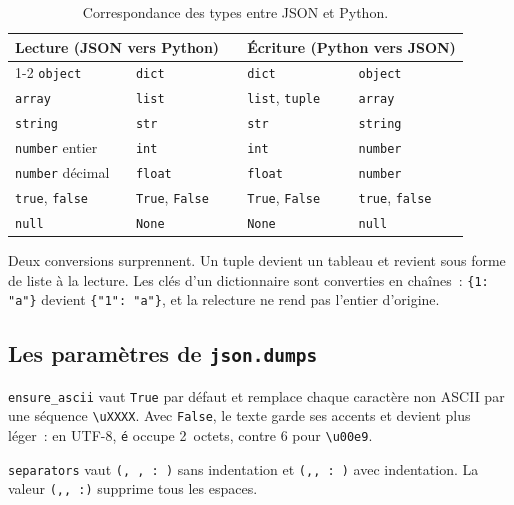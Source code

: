 \documentclass[12pt,a4paper]{article}
\newcommand{\exemple}[3][]{%
  \par\addvspace{6pt}\noindent\begin{minipage}{\linewidth}%
  \end{minipage}\par\addvspace{6pt}}
\begin{document}
\begin{table}[htbp]
\centering
\small
\begin{tabular}{llcll}
\toprule
\multicolumn{2}{c}{\textbf{Lecture (JSON vers Python)}} & & \multicolumn{2}{c}{\textbf{Écriture (Python vers JSON)}} \\
\cmidrule{1-2}\cmidrule{4-5}
\texttt{object} & \texttt{dict} & & \texttt{dict} & \texttt{object} \\
\texttt{array} & \texttt{list} & & \texttt{list}, \texttt{tuple} & \texttt{array} \\
\texttt{string} & \texttt{str} & & \texttt{str} & \texttt{string} \\
\texttt{number} entier & \texttt{int} & & \texttt{int} & \texttt{number} \\
\texttt{number} décimal & \texttt{float} & & \texttt{float} & \texttt{number} \\
\texttt{true}, \texttt{false} & \texttt{True}, \texttt{False} & & \texttt{True}, \texttt{False} & \texttt{true}, \texttt{false} \\
\texttt{null} & \texttt{None} & & \texttt{None} & \texttt{null} \\
\bottomrule
\end{tabular}
\caption{Correspondance des types entre JSON et Python.}
\label{tab:python}
\end{table}

Deux conversions surprennent. Un tuple devient un tableau et revient sous forme de liste à la lecture. Les clés d'un dictionnaire sont converties en chaînes~: \texttt{\{1: "a"\}} devient \texttt{\{"1": "a"\}}, et la relecture ne rend pas l'entier d'origine.

\subsection{Les paramètres de \texttt{json.dumps}}
\exemple[language=python]{python/01_dumps.py}{Paramètres principaux de \texttt{json.dumps}}

\texttt{ensure\_ascii} vaut \texttt{True} par défaut et remplace chaque caractère non ASCII par une séquence \texttt{\textbackslash uXXXX}. Avec \texttt{False}, le texte garde ses accents et devient plus léger~: en UTF-8, \texttt{é} occupe 2~octets, contre 6 pour \texttt{\textbackslash u00e9}.

\texttt{separators} vaut \texttt{(\textquotesingle{}, \textquotesingle{}, \textquotesingle{}: \textquotesingle{})} sans indentation et \texttt{(\textquotesingle{},\textquotesingle{}, \textquotesingle{}: \textquotesingle{})} avec indentation. La valeur \texttt{(\textquotesingle{},\textquotesingle{}, \textquotesingle{}:\textquotesingle{})} supprime tous les espaces.
\end{document}
